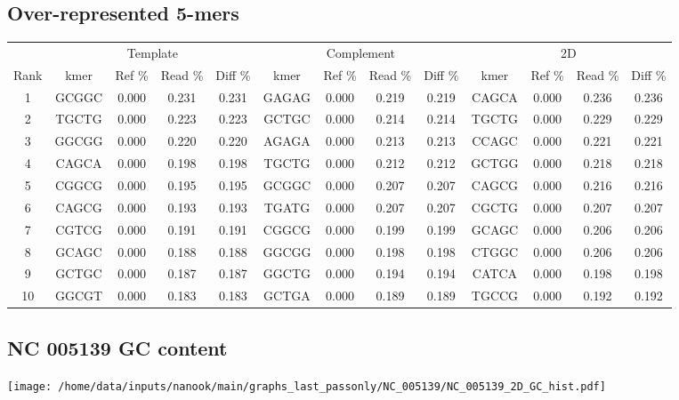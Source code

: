 \documentclass[a4paper,11pt,oneside]{article}
\begin{document}
\subsection*{Over-represented 5-mers}
\vspace{-3mm}
\begin{table}[H]
{\footnotesize
\fontsize{7pt}{9pt}\selectfont
\begin{tabular}{|c|c c c c|c c c c|c c c c|}
\cline{1-13}
 & \multicolumn{4}{c|}{Template} & \multicolumn{4}{c|}{Complement} & \multicolumn{4}{c|}{2D} \\
Rank & kmer & Ref \% & Read \% & Diff \% & kmer & Ref \% & Read \% & Diff \% & kmer & Ref \% & Read \% & Diff \% \\
\cline{1-13}
1 & GCGGC & 0.000 & 0.231 & 0.231 & GAGAG & 0.000 & 0.219 & 0.219 & CAGCA & 0.000 & 0.236 & 0.236 \\
2 & TGCTG & 0.000 & 0.223 & 0.223 & GCTGC & 0.000 & 0.214 & 0.214 & TGCTG & 0.000 & 0.229 & 0.229 \\
3 & GGCGG & 0.000 & 0.220 & 0.220 & AGAGA & 0.000 & 0.213 & 0.213 & CCAGC & 0.000 & 0.221 & 0.221 \\
4 & CAGCA & 0.000 & 0.198 & 0.198 & TGCTG & 0.000 & 0.212 & 0.212 & GCTGG & 0.000 & 0.218 & 0.218 \\
5 & CGGCG & 0.000 & 0.195 & 0.195 & GCGGC & 0.000 & 0.207 & 0.207 & CAGCG & 0.000 & 0.216 & 0.216 \\
6 & CAGCG & 0.000 & 0.193 & 0.193 & TGATG & 0.000 & 0.207 & 0.207 & CGCTG & 0.000 & 0.207 & 0.207 \\
7 & CGTCG & 0.000 & 0.191 & 0.191 & CGGCG & 0.000 & 0.199 & 0.199 & GCAGC & 0.000 & 0.206 & 0.206 \\
8 & GCAGC & 0.000 & 0.188 & 0.188 & GGCGG & 0.000 & 0.198 & 0.198 & CTGGC & 0.000 & 0.206 & 0.206 \\
9 & GCTGC & 0.000 & 0.187 & 0.187 & GGCTG & 0.000 & 0.194 & 0.194 & CATCA & 0.000 & 0.198 & 0.198 \\
10 & GGCGT & 0.000 & 0.183 & 0.183 & GCTGA & 0.000 & 0.189 & 0.189 & TGCCG & 0.000 & 0.192 & 0.192 \\
\cline{1-13}
\end{tabular}
}
\end{table}
\vspace{-8mm}
\begin{figure}[H]
\centering
   \end{figure}
\subsection*{NC 005139 GC content}
  \texttt{[image: /home/data/inputs/nanook/main/graphs\_last\_passonly/NC\_005139/NC\_005139\_2D\_GC\_hist.pdf]}
\clearpage
\end{document}
